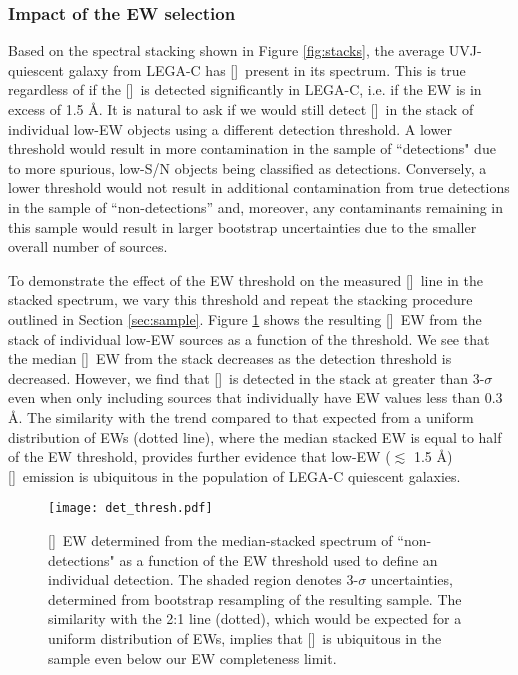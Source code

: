 \documentclass[twocolumn,natbib,iop,hyperref]{aastex62}
\newcommand{\oii}{[\ion{O}{2}]}
\begin{document}
\subsubsection{Impact of the EW selection}
\label{sec:ew}

Based on the spectral stacking shown in Figure \ref{fig:stacks}, the average UVJ-quiescent galaxy from LEGA-C has \oii\ present in its spectrum.  This is true regardless of if the \oii\ is detected significantly in LEGA-C, i.e. if the EW is in excess of 1.5 \AA.  It is natural to ask if we would still detect \oii\ in the stack of individual low-EW objects using a different detection threshold.  A lower threshold would result in more contamination in the sample of ``detections" due to more spurious, low-S/N objects being classified as detections.  Conversely, a lower threshold would not result in additional contamination from true detections in the sample of ``non-detections'' and, moreover, any contaminants remaining in this sample would result in larger bootstrap uncertainties due to the smaller overall number of sources.

To demonstrate the effect of the EW threshold on the measured \oii\ line in the stacked spectrum, we vary this threshold and repeat the stacking procedure outlined in Section \ref{sec:sample}.  Figure \ref{fig:ewthresh} shows the resulting \oii\ EW from the stack of individual low-EW sources as a function of the threshold.  We see that the median \oii\ EW from the stack decreases as the detection threshold is decreased.   However, we find that \oii\ is detected in the stack at greater than 3-$\sigma$ even when only including sources that individually have EW values less than 0.3 \AA.  The similarity with the trend compared to that expected from a uniform distribution of EWs (dotted line), where the median stacked EW is equal to half of the EW threshold, provides further evidence that low-EW ($\lesssim$ 1.5 \AA) \oii\ emission is ubiquitous in the population of LEGA-C quiescent galaxies.


\begin{figure}
\begin{center}
\texttt{[image: det\_thresh.pdf]} %
\caption{\oii\ EW determined from the median-stacked spectrum of ``non-detections" as a function of the EW threshold used to define an individual detection.  The shaded region denotes 3-$\sigma$ uncertainties, determined from bootstrap resampling of the resulting sample.  The similarity with the 2:1 line (dotted), which would be expected for a uniform distribution of EWs, implies that \oii\ is ubiquitous in the sample even below our EW completeness limit.}
\label{fig:ewthresh}
\end{center}
\end{figure}
\end{document}
